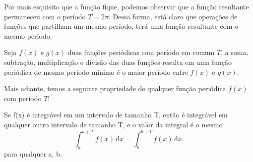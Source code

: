 Por mais esquisito que a função fique, podemos observar que a função resultante
permaneceu com o período $T = 2\pi$. Dessa forma, está claro que operações 
de funções que partilham um mesmo período, terá uma função resultante com o mesmo
período.\\

\begin{definicao}
    Seja $f(x)$ e $g(x)$ duas funções periódicas com período em comum $T$, a soma, subtração,
    multiplicação e divisão das duas funções resulta em uma função periódica de 
    mesmo período mínimo é o maior período entre $f(x)$ e $g(x)$.
\end{definicao}

Mais adiante, temos a seguinte propriedade de qualquer função periódica $f(x)$
com período $T$:\\
\begin{definicao}
\label{def}
Se f(x) é integrável em um intervalo de tamanho T,
então é integrável em qualquer outro intervalo de tamanho T, e o valor da integral
é o mesmo\\
\begin{equation}
\label{int_prop1}
    \int_a^{a+T} \! f(x) \, \mathrm{d}x = \int_b^{b+T} \! f(x) \, \mathrm{d}x.
\end{equation}
para qualquer a, b. \\
\end{definicao}

